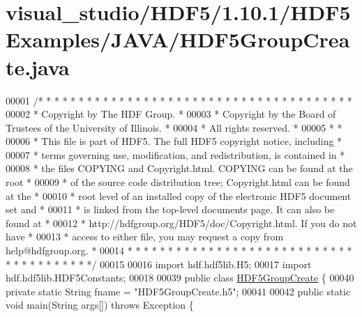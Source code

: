 \hypertarget{visual__studio_2_h_d_f5_21_810_81_2_h_d_f5_examples_2_j_a_v_a_2_h_d_f5_group_create_8java_source}{}\section{visual\+\_\+studio/\+H\+D\+F5/1.10.1/\+H\+D\+F5\+Examples/\+J\+A\+V\+A/\+H\+D\+F5\+Group\+Create.java}
\label{visual__studio_2_h_d_f5_21_810_81_2_h_d_f5_examples_2_j_a_v_a_2_h_d_f5_group_create_8java_source}

\begin{DoxyCode}
00001 \textcolor{comment}{/* * * * * * * * * * * * * * * * * * * * * * * * * * * * * * * * * * * * * * *}
00002 \textcolor{comment}{ * Copyright by The HDF Group.                                               *}
00003 \textcolor{comment}{ * Copyright by the Board of Trustees of the University of Illinois.         *}
00004 \textcolor{comment}{ * All rights reserved.                                                      *}
00005 \textcolor{comment}{ *                                                                           *}
00006 \textcolor{comment}{ * This file is part of HDF5.  The full HDF5 copyright notice, including     *}
00007 \textcolor{comment}{ * terms governing use, modification, and redistribution, is contained in    *}
00008 \textcolor{comment}{ * the files COPYING and Copyright.html.  COPYING can be found at the root   *}
00009 \textcolor{comment}{ * of the source code distribution tree; Copyright.html can be found at the  *}
00010 \textcolor{comment}{ * root level of an installed copy of the electronic HDF5 document set and   *}
00011 \textcolor{comment}{ * is linked from the top-level documents page.  It can also be found at     *}
00012 \textcolor{comment}{ * http://hdfgroup.org/HDF5/doc/Copyright.html.  If you do not have          *}
00013 \textcolor{comment}{ * access to either file, you may request a copy from help@hdfgroup.org.     *}
00014 \textcolor{comment}{ * * * * * * * * * * * * * * * * * * * * * * * * * * * * * * * * * * * * * * */}
00015 
00016 \textcolor{keyword}{import} hdf.hdf5lib.H5;
00017 \textcolor{keyword}{import} hdf.hdf5lib.HDF5Constants;
00018 
00039 \textcolor{keyword}{public} \textcolor{keyword}{class }\hyperlink{class_h_d_f5_group_create}{HDF5GroupCreate} \{
00040     \textcolor{keyword}{private} \textcolor{keyword}{static} String fname = \textcolor{stringliteral}{"HDF5GroupCreate.h5"};
00041 
00042     \textcolor{keyword}{public} \textcolor{keyword}{static} \textcolor{keywordtype}{void} main(String args[]) \textcolor{keywordflow}{throws} Exception \{

\end{DoxyCode}
